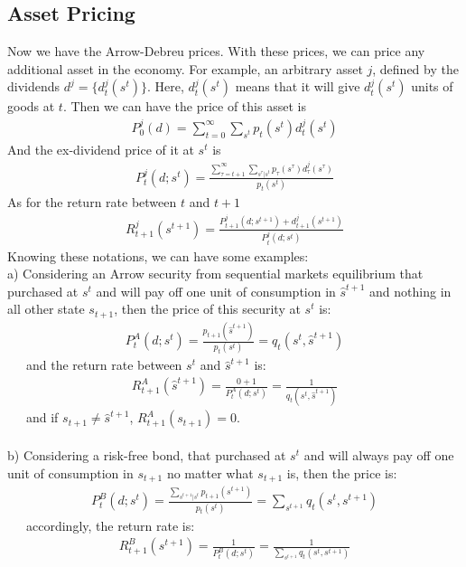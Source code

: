 \documentclass{article}
\begin{document}
\subsection{Asset Pricing}
Now we have the Arrow-Debreu prices. With these prices, we can price any additional asset in the economy. For example, an arbitrary asset $j$, defined by the dividends $d^j = \{d^j_t(s^t)\}$. Here, $d^j_t(s^t)$ means that it will give $d^j_t(s^t)$ units of goods at $t$. Then we can have the price of this asset is 
\begin{align*}
	P^j_0(d) = \sum\limits^\infty_{t=0} \sum\limits_{s^t} p_t(s^t) d^j_t(s^t)
\end{align*}
And the ex-dividend price of it at $s^t$ is
\begin{align*}
	P^j_t(d; s^t) = \frac{\sum^\infty_{\tau=t+1} \sum_{s^\tau|s^t} p_{\tau}(s^\tau) d^j_{\tau}(s^\tau)}{p_t(s^t)}
\end{align*}
As for the return rate between $t$ and $t+1$
\begin{align*}
	R^j_{t+1}(s^{t+1}) = \frac{P^j_{t+1}(d; s^{t+1}) + d^j_{t+1}(s^{t+1})}{P^j_t(d; s^t)}
\end{align*}
Knowing these notations, we can have some examples:\\
\indent a) Considering an Arrow security from sequential markets equilibrium that purchased at $s^t$ and will pay off one unit of consumption in $\hat{s}^{t+1}$ and nothing in all other state $s_{t+1}$, then the price of this security at $s^t$ is:
\begin{align*}
	P^A_t(d; s^t) = \frac{p_{t+1}(\hat{s}^{t+1})}{p_t(s^t)} = q_t(s^t, \hat{s}^{t+1})
\end{align*}
\indent\ \ \, and the return rate between $s^t$ and $\hat{s}^{t+1}$ is:
\begin{align*}
	R^A_{t+1}(\hat{s}^{t+1}) = \frac{0 + 1}{P^A_t(d; s^t)} = \frac{1}{q_t(s^t, \hat{s}^{t+1})}
\end{align*}
\indent\ \ \, and if $s_{t+1} \neq \hat{s}^{t+1}$, $R^A_{t+1}(s_{t+1}) = 0$.\\\\
\indent b) Considering a risk-free bond, that purchased at $s^t$ and will always pay off one unit of consumption in $s_{t+1}$ no matter what $s_{t+1}$ is, then the price is:
\begin{align*}
	P^B_{t}(d; s^t) = \frac{\sum_{s^{t+1}|s^t} p_{t+1}(s^{t+1})}{p_t(s^t)} = \sum\limits_{s^{t+1}} q_t(s^t, s^{t+1})
\end{align*}
\indent\ \ \, accordingly, the return rate is:
\begin{align*}
	R^B_{t+1}(s^{t+1}) = \frac{1}{P^B_{t}(d; s^t)} = \frac{1}{\sum\limits_{s^{t+1}} q_t(s^t, s^{t+1})}
\end{align*}
\end{document}
